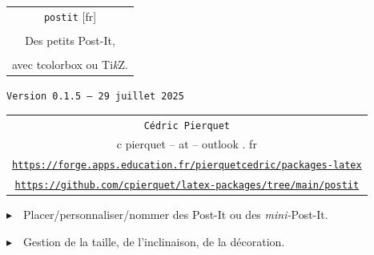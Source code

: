 \documentclass[french,a4paper,11pt]{article}
\def\TPversion{0.1.5}
\def\TPdate{29 juillet 2025}
\begin{document}
\setlength{\aweboxleftmargin}{0.07\linewidth}
\setlength{\aweboxcontentwidth}{0.93\linewidth}
\setlength{\aweboxvskip}{8pt}

\pagestyle{fancy}

\thispagestyle{empty}

\vspace{2cm}

\begin{center}
	\begin{minipage}{0.75\linewidth}
	\begin{tcolorbox}[colframe=yellow,colback=yellow!15]
		\begin{center}
			\begin{tabular}{c}
				{\Huge \texttt{postit} [fr]}\\
				\\
				{\LARGE Des petits Post-It,} \\
				\\
				{\LARGE avec \textsf{tcolorbox} ou \textsf{Ti\textit{k}Z}.} \\
			\end{tabular}
			
			\bigskip
			
			{\small \texttt{Version \TPversion{} -- \TPdate}}
		\end{center}
	\end{tcolorbox}
\end{minipage}
\end{center}

\begin{center}
	\begin{tabular}{c}
	\texttt{Cédric Pierquet}\\
	{\ttfamily c pierquet -- at -- outlook . fr}\\
	\texttt{\url{https://forge.apps.education.fr/pierquetcedric/packages-latex}}\\
	\texttt{\url{https://github.com/cpierquet/latex-packages/tree/main/postit}}
\end{tabular}
\end{center}

\vspace{0.25cm}

{$\blacktriangleright$~~Placer/personnaliser/nommer des Post-It ou des \textit{mini-}Post-It.}

\vspace{0.25cm}

{$\blacktriangleright$~~Gestion de la taille, de l'inclinaison, de la décoration.}
\end{document}
